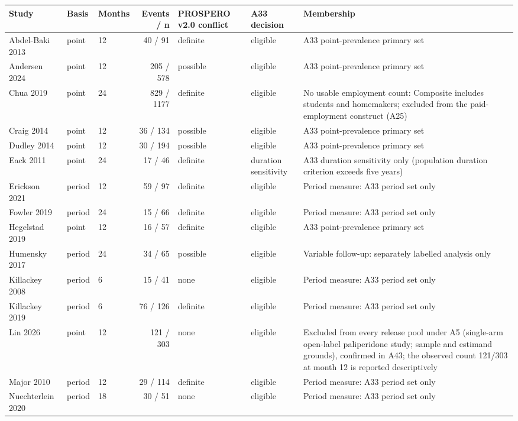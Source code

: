 
\begin{tabular}{lllrllp{5.5cm}}
\toprule
Study & Basis & Months & Events / n & PROSPERO v2.0 conflict & A33 decision & Membership\\
\midrule
Abdel-Baki 2013 & point & 12 & 40 / 91 & definite & eligible & A33 point-prevalence primary set\\
Andersen 2024 & point & 12 & 205 / 578 & possible & eligible & A33 point-prevalence primary set\\
Chua 2019 & point & 24 & 829 / 1177 & definite & eligible & No usable employment count: Composite includes students and homemakers; excluded from the paid-employment construct (A25)\\
Craig 2014 & point & 12 & 36 / 134 & possible & eligible & A33 point-prevalence primary set\\
Dudley 2014 & point & 12 & 30 / 194 & possible & eligible & A33 point-prevalence primary set\\
Eack 2011 & point & 24 & 17 / 46 & definite & duration sensitivity & A33 duration sensitivity only (population duration criterion exceeds five years)\\
Erickson 2021 & period & 12 & 59 / 97 & definite & eligible & Period measure: A33 period set only\\
Fowler 2019 & period & 24 & 15 / 66 & definite & eligible & Period measure: A33 period set only\\
Hegelstad 2019 & point & 12 & 16 / 57 & definite & eligible & A33 point-prevalence primary set\\
Humensky 2017 & period & 24 & 34 / 65 & possible & eligible & Variable follow-up: separately labelled analysis only\\
Killackey 2008 & period & 6 & 15 / 41 & none & eligible & Period measure: A33 period set only\\
Killackey 2019 & period & 6 & 76 / 126 & definite & eligible & Period measure: A33 period set only\\
Lin 2026 & point & 12 & 121 / 303 & none & eligible & Excluded from every release pool under A5 (single-arm open-label paliperidone study; sample and estimand grounds), confirmed in A43; the observed count 121/303 at month 12 is reported descriptively\\
Major 2010 & period & 12 & 29 / 114 & definite & eligible & Period measure: A33 period set only\\
Nuechterlein 2020 & period & 18 & 30 / 51 & none & eligible & Period measure: A33 period set only\\

\end{tabular}
